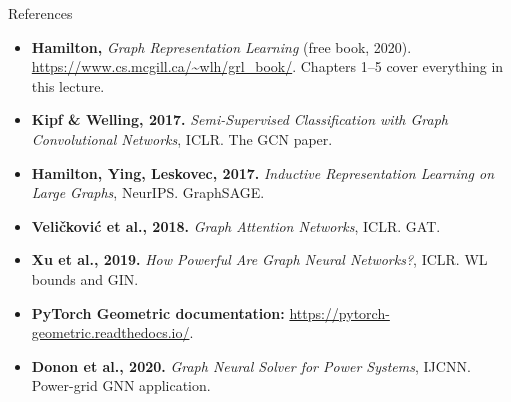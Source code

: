 \documentclass[aspectratio=169,10pt]{beamer}
\begin{document}
\begin{frame}{References}
\footnotesize
\begin{itemize}
  \item \textbf{Hamilton,} \emph{Graph Representation Learning} (free book, 2020). \url{https://www.cs.mcgill.ca/~wlh/grl_book/}. Chapters 1--5 cover everything in this lecture.
  \item \textbf{Kipf \& Welling, 2017.} \emph{Semi-Supervised Classification with Graph Convolutional Networks}, ICLR. The GCN paper.
  \item \textbf{Hamilton, Ying, Leskovec, 2017.} \emph{Inductive Representation Learning on Large Graphs}, NeurIPS. GraphSAGE.
  \item \textbf{Veli\v{c}kovi\'c et al., 2018.} \emph{Graph Attention Networks}, ICLR. GAT.
  \item \textbf{Xu et al., 2019.} \emph{How Powerful Are Graph Neural Networks?}, ICLR. WL bounds and GIN.
  \item \textbf{PyTorch Geometric documentation:} \url{https://pytorch-geometric.readthedocs.io/}.
  \item \textbf{Donon et al., 2020.} \emph{Graph Neural Solver for Power Systems}, IJCNN. Power-grid GNN application.
\end{itemize}
\end{frame}
\end{document}
